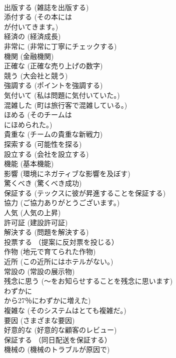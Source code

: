 \documentclass[8pt]{extreport}
\begin{document}
\begin{CJK}{UTF8}{min}
\\	出版する	(雑誌を出版する)		
\\	添付する	(その本には
\\	が付いてきます。)		
\\	経済の	(経済成長)		
\\	非常に	(非常に丁寧にチェックする)		
\\	機関	(金融機関)		
\\	正確な	(正確な売り上げの数字)		
\\	競う	(大会社と競う)		
\\	強調する	(ポイントを強調する)		
\\	気付いて	(私は問題に気付いていた。)		
\\	混雑した	(町は旅行客で混雑している。)		
\\	ほめる	(そのチームは
\\	にほめられた。)		
\\	貴重な	(チームの貴重な新戦力)		
\\	探索する	(可能性を探る)		
\\	設立する	(会社を設立する)		
\\	機能	(基本機能)		
\\	影響	(環境にネガティブな影響を及ぼす)		
\\	驚くべき	(驚くべき成功)		
\\	保証する	(テックスに彼が昇進することを保証する)		
\\	協力	(ご協力ありがとうございます。)		
\\	人気	(人気の上昇)		
\\	許可証	(建設許可証)		
\\	解決する	(問題を解決する)		
\\	投票する	（提案に反対票を投じる）		
\\	作物	(地元で育てられた作物)		
\\	近所	(この近所にはホテルがない。)		
\\	常設の	(常設の展示物)		
\\	残念に思う	(～をお知らせすることを残念に思います)		
\\	わずかに	
\\	から27％にわずかに増えた)		
\\	複雑な	(そのシステムはとても複雑だ。)		
\\	要因	(さまざまな要因)		
\\	好意的な	(好意的な顧客のレビュー)		
\\	保証する	（同日配送を保証する）		
\\	機械の	(機械のトラブルが原因で)		

\end{CJK}
\end{document}

